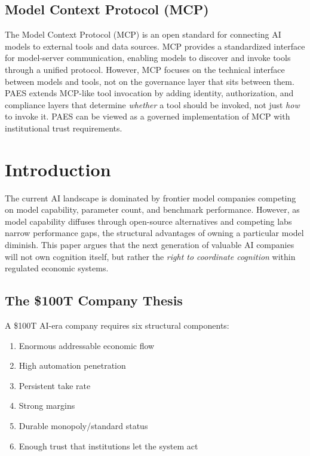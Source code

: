 \documentclass[11pt,a4paper]{article}
\begin{document}
\subsection{Model Context Protocol (MCP)}

The Model Context Protocol (MCP) is an open standard for connecting AI models to external tools and data sources. MCP provides a standardized interface for model-server communication, enabling models to discover and invoke tools through a unified protocol. However, MCP focuses on the technical interface between models and tools, not on the governance layer that sits between them. PAES extends MCP-like tool invocation by adding identity, authorization, and compliance layers that determine \textit{whether} a tool should be invoked, not just \textit{how} to invoke it. PAES can be viewed as a governed implementation of MCP with institutional trust requirements.

\section{Introduction}

The current AI landscape is dominated by frontier model companies competing on model capability, parameter count, and benchmark performance. However, as model capability diffuses through open-source alternatives and competing labs narrow performance gaps, the structural advantages of owning a particular model diminish. This paper argues that the next generation of valuable AI companies will not own cognition itself, but rather the \textit{right to coordinate cognition} within regulated economic systems.

\subsection{The \$100T Company Thesis}

A \$100T AI-era company requires six structural components:
\begin{enumerate}
    \item Enormous addressable economic flow
    \item High automation penetration
    \item Persistent take rate
    \item Strong margins
    \item Durable monopoly/standard status
    \item Enough trust that institutions let the system act
\end{enumerate}
\end{document}

